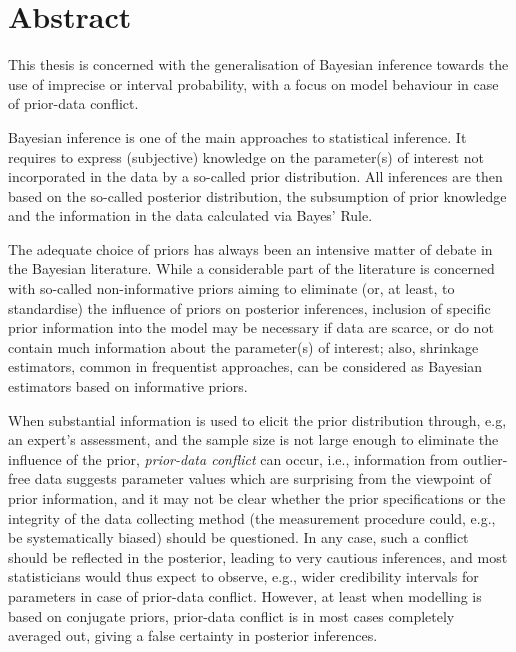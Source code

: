 \chapter*{Abstract}

This thesis is concerned with the generalisation of Bayesian inference towards the use of imprecise or interval probability,
with a focus on model behaviour in case of prior-data conflict.

Bayesian inference is one of the main approaches to statistical inference.
It requires to express (subjective) knowledge on the parameter(s) of interest not incorporated in the data by a so-called prior distribution.
All inferences are then based on the so-called posterior distribution,
the subsumption of prior knowledge and the information in the data calculated via Bayes' Rule.

The adequate choice of priors has always been an intensive matter of debate in the Bayesian literature.
While a considerable part of the literature is concerned with so-called non-informative priors
aiming to eliminate (or, at least, to standardise) the influence of priors on posterior inferences,
inclusion of specific prior information into the model may be necessary if data are scarce,
or do not contain much information about the parameter(s) of interest;
also, shrinkage estimators, common in frequentist approaches, can be considered as Bayesian estimators based on informative priors.

When substantial information is used to elicit the prior distribution through, e.g, an expert's assessment,
and the sample size is not large enough to eliminate the influence of the prior, \emph{prior-data conflict} can occur,
i.e., information from outlier-free data suggests parameter values which are surprising from the viewpoint of prior information,
and it may not be clear whether the prior specifications or the integrity of the data collecting method
(the measurement procedure could, e.g., be systematically biased) should be questioned.
In any case, such a conflict should be reflected in the posterior, leading to very cautious inferences,
and most statisticians would thus expect to observe, e.g., wider credibility intervals for parameters in case of prior-data conflict.
However, at least when modelling is based on conjugate priors, prior-data conflict is in most cases completely averaged out,
giving a false certainty in posterior inferences.

%
%
%

